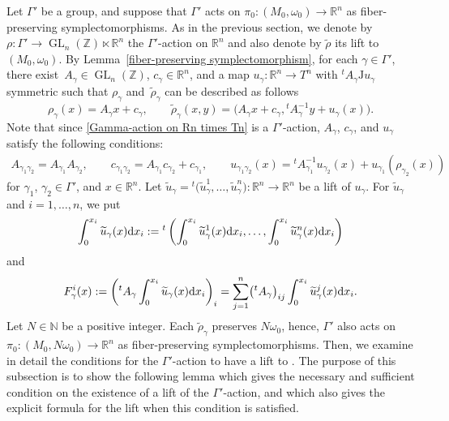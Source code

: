 \documentclass[10pt,a4paper]{amsart}
\numberwithin{equation}{section}
\newcommand{\R}{\mathbb{R}}
\newcommand{\Z}{\mathbb{Z}}
\newcommand{\N}{\mathbb{N}}
\renewcommand{\tilde}{\widetilde}
\def\GL{\operatorname{GL}}
\def\J{\mathrm{J}}
\begin{document}
Let $\Gamma'$ be a group,
and suppose that $\Gamma'$ acts on $\pi_0\colon (M_0,\omega_0)\to \R^n$ as fiber-preserving symplectomorphisms. As in the previous section, we denote by $\rho\colon \Gamma' \to \GL_n(\Z)\ltimes \R^n$ the $\Gamma'$-action on $\R^n$ and also denote by $\tilde \rho$ its lift to $(M_0,\omega_0)$.
By Lemma~\ref{fiber-preserving symplectomorphism}, for each $\gamma\in \Gamma'$, there exist~${A_\gamma \in\GL_n(\Z)}$, $c_\gamma\in \R^n$, and a map $u_\gamma\colon \R^n\to T^n$ with ${}^tA_\gamma \J u_\gamma$ symmetric such that $\rho_\gamma$ and~$\tilde \rho_\gamma$ can be described as follows
\begin{equation}\label{Gamma-action on Rn times Tn}
\rho_\gamma (x)=A_\gamma x+c_\gamma ,\qquad {\tilde \rho}_\gamma (x,y)=\bigl(A_\gamma x+c_\gamma ,{}^tA_\gamma^{-1}y+u_\gamma (x)\bigr) .
\end{equation}
Note that since \eqref{Gamma-action on Rn times Tn} is a $\Gamma'$-action, $A_\gamma$, $c_\gamma$, and $u_\gamma$ satisfy the following conditions:
\begin{gather}
A_{\gamma_1\gamma_2}=A_{\gamma_1}A_{\gamma_2},\qquad
c_{\gamma_1\gamma_2}=A_{\gamma_1}c_{\gamma_2}+c_{\gamma_1},\qquad
u_{\gamma_1\gamma_2}(x)={}^tA_{\gamma_1}^{-1}u_{\gamma_2}(x)+u_{\gamma_1}(\rho_{\gamma_2}(x))\label{condition for action}
\end{gather}
for $\gamma_1$, $\gamma_2\in \Gamma'$, and $x\in \R^n$.
Let ${\tilde u}_\gamma={}^t\bigl({\tilde u}_\gamma^1,\ldots ,{\tilde u}_\gamma^n\bigr)\colon \R^n\to \R^n$ be a lift of $u_\gamma$. For ${\tilde u}_\gamma$ and $i=1,\ldots ,n$, we put
\[
\int_0^{x_i}{\tilde u}_\gamma (x){\rm d}x_i:=
{}^t\left(\int_0^{x_i}{\tilde u}_\gamma^1 (x){\rm d}x_i, \ldots , \int_0^{x_i}{\tilde u}_\gamma^n (x){\rm d}x_i\right)
\]
and
\[
F_\gamma^i(x):=\left({}^tA_\gamma \int_0^{x_i}{\tilde u}_\gamma (x){\rm d}x_i\right)_i=\sum_{j=1}^n\bigl({}^tA_\gamma\bigr)_{ij}\int_0^{x_i}{\tilde u}_\gamma^j (x){\rm d}x_i.
\]
Let $N\in \N$ be a positive integer. Each $\tilde \rho_\gamma$ preserves $N\omega_0$, hence, $\Gamma'$ also acts on $\pi_0\colon (M_0,N\omega_0)\to \R^n$ as fiber-preserving symplectomorphisms. Then, we examine in detail the conditions for the $\Gamma'$-action to have a lift to . The purpose of this subsection is to show the following lemma which gives the necessary and sufficient condition on the existence of a lift of the $\Gamma'$-action, and which also gives the explicit formula for the lift when this condition is satisfied.
\end{document}
